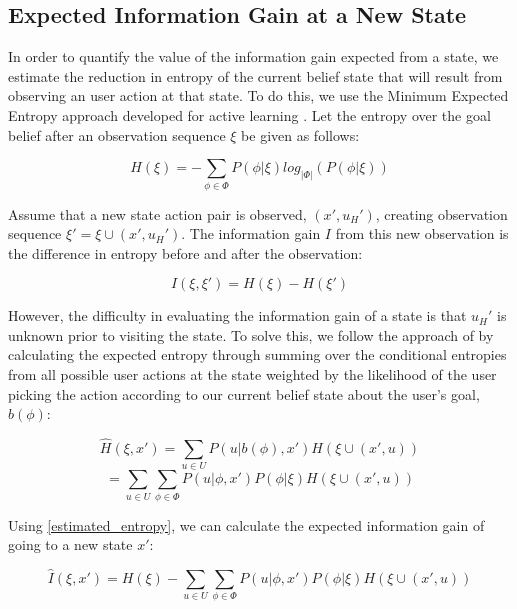 \documentclass[conference]{IEEEtran}
\begin{document}
\subsection{Expected Information Gain at a New State}

In order to quantify the value of the information gain expected from a state, we estimate the reduction in entropy of the current belief state that will result from observing an user action at that state. To do this, we use the Minimum Expected Entropy approach developed for active learning \cite{holub2008entropy}. Let the entropy over the goal belief after an observation sequence $\xi$ be given as follows:

\begin{equation}
H(\xi) = -\sum_{\phi \in \Phi} P(\phi|\xi)log_{|\Phi|}(P(\phi|\xi))
\end{equation}

Assume that a new state action pair is observed, $(x',u_H')$, creating observation sequence $\xi' = \xi \cup (x', u_H')$. The information gain $I$ from this new observation is the difference in entropy before and after the observation:

\begin{equation}
I(\xi, \xi') = H(\xi) - H(\xi')
\end{equation}

However, the difficulty in evaluating the information gain of a state is that $u_H'$ is unknown prior to visiting the state. To solve this, we follow the approach of \citet{holub2008entropy} by calculating the expected entropy through summing over the conditional entropies from all possible user actions at the state weighted by the likelihood of the user picking the action according to our current belief state about the user's goal, $b(\phi)$:

\[
\hat{H}(\xi, x') = \sum_{u \in U} P(u|b(\phi),x')H(\xi \cup (x', u))
\]
\begin{equation}\label{estimated_entropy}
= \sum_{u \in U} \sum_{\phi \in \Phi} P(u|\phi,x')P(\phi|\xi)H(\xi \cup (x', u))
\end{equation}

Using \eqref{estimated_entropy}, we can calculate the expected information gain of going to a new state $x'$:

\begin{equation}
\hat{I}(\xi, x') = H(\xi) - \sum_{u \in U} \sum_{\phi \in \Phi} P(u|\phi,x')P(\phi|\xi)H(\xi \cup (x', u))
\end{equation}
\end{document}
